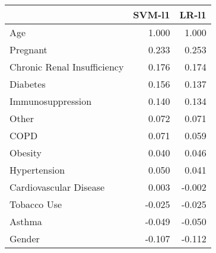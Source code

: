 \begin{tabular}{lrr}
\toprule
{} &  SVM-l1 &  LR-l1 \\
\midrule
Age                         &   1.000 &  1.000 \\
Pregnant                    &   0.233 &  0.253 \\
Chronic Renal Insufficiency &   0.176 &  0.174 \\
Diabetes                    &   0.156 &  0.137 \\
Immunosuppression           &   0.140 &  0.134 \\
Other                       &   0.072 &  0.071 \\
COPD                        &   0.071 &  0.059 \\
Obesity                     &   0.040 &  0.046 \\
Hypertension                &   0.050 &  0.041 \\
Cardiovascular Disease      &   0.003 & -0.002 \\
Tobacco Use                 &  -0.025 & -0.025 \\
Asthma                      &  -0.049 & -0.050 \\
Gender                      &  -0.107 & -0.112 \\
\bottomrule
\end{tabular}
